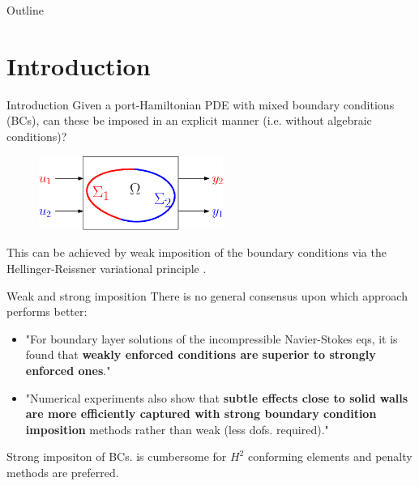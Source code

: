 \documentclass[aspectratio=169]{beamer}
\begin{document}
	
	
	\begin{frame}[plain]
		
		
		
	\end{frame}
	
	
	\begin{frame}{Outline}
		
		\tableofcontents
		
	\end{frame}

\section{Introduction}

\begin{frame}{Introduction}
	Given a port-Hamiltonian PDE with mixed boundary conditions (BCs), can these be imposed in an explicit manner (i.e. without algebraic conditions)?
	
	\begin{figure}
		\centering	
		\includegraphics[width=6cm]{bound_part.eps}
	\end{figure}
	
	\vspace{1cm}
	This can be achieved by weak imposition of the boundary conditions via the Hellinger-Reissner variational principle .
	
	

\end{frame}

\begin{frame}{Weak and strong imposition}
	There is no general consensus upon which approach performs better:
	
	\begin{itemize}
		\item  "For boundary layer solutions of the incompressible Navier-Stokes eqs, it is found that \textbf{weakly enforced conditions are superior to strongly enforced ones}."
		\item "Numerical experiments also show that \textbf{subtle effects close to solid walls are more efficiently captured with strong boundary condition imposition} methods rather than weak (less dofs. required)."
	\end{itemize}

Strong impositon of BCs. is cumbersome for $H^2$ conforming elements and penalty methods are preferred.  
\end{frame}
\end{document}
